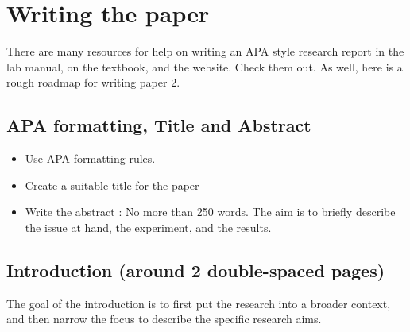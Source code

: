 \section{Writing the paper}

There are many resources for help on writing an APA style research report in the lab manual, on the textbook, and the website. Check them out. As well, here is a rough roadmap for writing paper 2.

\subsection{APA formatting, Title and Abstract}

\begin{itemize}
\item Use APA formatting rules.

\item Create a suitable title for the paper

\item Write the abstract : No more than 250 words. The aim is to briefly describe the issue at hand, the experiment, and the results.
\end{itemize}

\subsection{Introduction (around 2 double-spaced pages)}

The goal of the introduction is to first put the research into a broader context, and then narrow the focus to describe the specific research aims.

